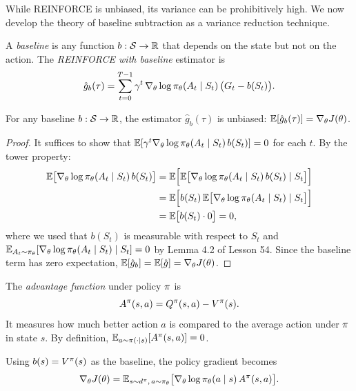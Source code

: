 \documentclass[11pt,a4paper]{article}
\begin{document}
While REINFORCE is unbiased, its variance can be prohibitively high.
We now develop the theory of baseline subtraction as a variance
reduction technique.

\begin{definition}[Baseline]
\label{def:baseline}
A \emph{baseline} is any function $b : \mathcal{S} \to \mathbb{R}$ that depends on
the state but not on the action. The \emph{REINFORCE with baseline}
estimator is
\[
  \hat{g}_b(\tau) = \sum_{t=0}^{T-1} \gamma^t\,
  \nabla_\theta \log \pi_\theta(A_t \mid S_t)\,
  \bigl(G_t - b(S_t)\bigr).
\]
\end{definition}

\begin{proposition}
\label{prop:baseline-unbiased}
For any baseline $b : \mathcal{S} \to \mathbb{R}$, the estimator $\hat{g}_b(\tau)$
is unbiased: $\mathbb{E}[\hat{g}_b(\tau)] = \nabla_\theta J(\theta)$.
\end{proposition}

\begin{proof}
It suffices to show that
$\mathbb{E}[\gamma^t \nabla_\theta \log \pi_\theta(A_t \mid S_t)\,
b(S_t)] = 0$ for each $t$. By the tower property:
\begin{align*}
  \mathbb{E}\bigl[\nabla_\theta \log \pi_\theta(A_t \mid S_t)\, b(S_t)\bigr]
  &= \mathbb{E}\Bigl[\mathbb{E}\bigl[\nabla_\theta \log \pi_\theta(A_t \mid S_t)\,
     b(S_t) \mid S_t\bigr]\Bigr] \\
  &= \mathbb{E}\Bigl[b(S_t)\, \mathbb{E}\bigl[\nabla_\theta \log
     \pi_\theta(A_t \mid S_t) \mid S_t\bigr]\Bigr] \\
  &= \mathbb{E}\bigl[b(S_t) \cdot 0\bigr] = 0,
\end{align*}
where we used that $b(S_t)$ is measurable with respect to $S_t$ and
$\mathbb{E}_{A_t \sim \pi_\theta}[\nabla_\theta \log \pi_\theta(A_t \mid S_t)
\mid S_t] = 0$ by Lemma 4.2 of Lesson 54. Since the baseline term has
zero expectation, $\mathbb{E}[\hat{g}_b] = \mathbb{E}[\hat{g}] = \nabla_\theta J(\theta)$.
\end{proof}

\begin{definition}
\label{def:advantage}
The \emph{advantage function} under policy $\pi$ is
\[
  A^{\pi}(s,a) = Q^{\pi}(s,a) - V^{\pi}(s).
\]
It measures how much better action $a$ is compared to the average
action under $\pi$ in state $s$. By definition,
$\mathbb{E}_{a \sim \pi(\cdot \mid s)}[A^{\pi}(s,a)] = 0$.
\end{definition}

\begin{proposition}
\label{prop:advantage-pg}
Using $b(s) = V^{\pi}(s)$ as the baseline, the policy gradient becomes
\[
  \nabla_\theta J(\theta) = \mathbb{E}_{s \sim d^{\pi},\, a \sim \pi_\theta}
  \bigl[\nabla_\theta \log \pi_\theta(a \mid s)\, A^{\pi}(s,a)\bigr].
\]
\end{proposition}
\end{document}
